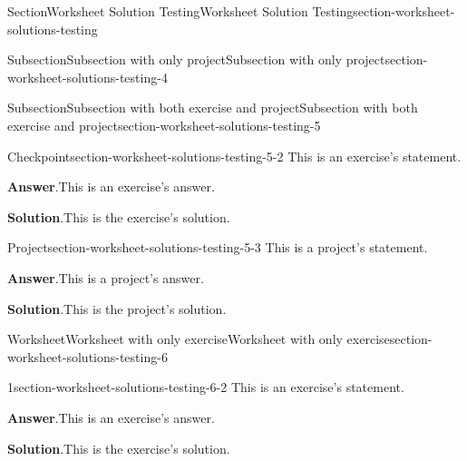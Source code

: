 \documentclass[oneside,10pt,]{article}
\newcommand{\blocktitlefont}{\relax}
\numberwithin{equation}{section}
\begin{document}
\begin{sectionptx}{Section}{Worksheet Solution Testing}{}{Worksheet Solution Testing}{}{}{section-worksheet-solutions-testing}
\begin{subsectionptx}{Subsection}{Subsection with only project}{}{Subsection with only project}{}{}{section-worksheet-solutions-testing-4}
\end{subsectionptx}
%
%
\typeout{************************************************}
\typeout{************************************************}
%
\begin{subsectionptx}{Subsection}{Subsection with both exercise and project}{}{Subsection with both exercise and project}{}{}{section-worksheet-solutions-testing-5}
\begin{inlineexercise}{Checkpoint}{}{section-worksheet-solutions-testing-5-2}%
This is an exercise's statement.%
\par\smallskip%
\noindent\textbf{\blocktitlefont Answer}.\hypertarget{section-worksheet-solutions-testing-5-2-2}{}\quad{}This is an exercise's answer.%
\par\smallskip%
\noindent\textbf{\blocktitlefont Solution}.\hypertarget{section-worksheet-solutions-testing-5-2-3}{}\quad{}This is the exercise's solution.%
\end{inlineexercise}%
\begin{project}{Project}{}{section-worksheet-solutions-testing-5-3}%
This is a project's statement.%
\par\smallskip%
\noindent\textbf{\blocktitlefont Answer}.\hypertarget{section-worksheet-solutions-testing-5-3-2}{}\quad{}This is a project's answer.%
\par\smallskip%
\noindent\textbf{\blocktitlefont Solution}.\hypertarget{section-worksheet-solutions-testing-5-3-3}{}\quad{}This is the project's solution.%
\end{project}%
\end{subsectionptx}
%
%
\typeout{************************************************}
\typeout{************************************************}
%
\begin{worksheet-subsection}{Worksheet}{Worksheet with only exercise}{}{Worksheet with only exercise}{}{}{section-worksheet-solutions-testing-6}
\begin{divisionexercise}{1}{}{}{section-worksheet-solutions-testing-6-2}%
This is an exercise's statement.%
\par\smallskip%
\noindent\textbf{\blocktitlefont Answer}.\hypertarget{section-worksheet-solutions-testing-6-2-2}{}\quad{}This is an exercise's answer.%
\par\smallskip%
\noindent\textbf{\blocktitlefont Solution}.\hypertarget{section-worksheet-solutions-testing-6-2-3}{}\quad{}This is the exercise's solution.%

\end{divisionexercise}
\end{worksheet-subsection}
\end{sectionptx}
\end{document}
